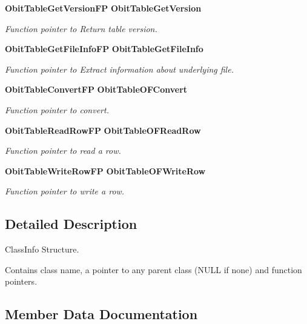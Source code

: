 \begin{CompactItemize}
{\bf Obit\-Table\-Get\-Version\-FP} {\bf Obit\-Table\-Get\-Version}
\begin{CompactList}\small\item\em Function pointer to Return table version. \item\end{CompactList}\item 
{\bf Obit\-Table\-Get\-File\-Info\-FP} {\bf Obit\-Table\-Get\-File\-Info}
\begin{CompactList}\small\item\em Function pointer to Extract information about underlying file. \item\end{CompactList}\item 
{\bf Obit\-Table\-Convert\-FP} {\bf Obit\-Table\-OFConvert}
\begin{CompactList}\small\item\em Function pointer to convert. \item\end{CompactList}\item 
{\bf Obit\-Table\-Read\-Row\-FP} {\bf Obit\-Table\-OFRead\-Row}
\begin{CompactList}\small\item\em Function pointer to read a row. \item\end{CompactList}\item 
{\bf Obit\-Table\-Write\-Row\-FP} {\bf Obit\-Table\-OFWrite\-Row}
\begin{CompactList}\small\item\em Function pointer to write a row. \item\end{CompactList}\end{CompactItemize}


\subsection{Detailed Description}
Class\-Info Structure. 

Contains class name, a pointer to any parent class (NULL if none) and function pointers. 



\subsection{Member Data Documentation}
